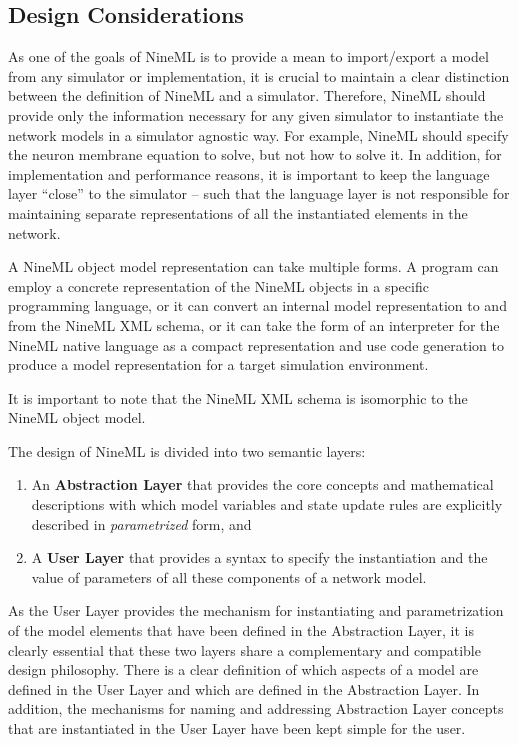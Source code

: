 \documentclass[draftspec]{ninemlspec}
\begin{document}
\subsection{Design Considerations}

As one of the goals of NineML is to provide a mean to import/export a model from
any simulator or implementation, it is crucial to maintain a clear distinction
between the definition of NineML and a simulator. Therefore, NineML should
provide only the information necessary for any given simulator
to instantiate the network models in a simulator agnostic way.
For example, NineML should specify the neuron membrane equation to solve,
but not how to solve it.  In addition, for implementation and performance
reasons, it is important to keep the language layer ``close'' to the simulator
-- such that the language layer is not responsible for maintaining separate
representations of all the instantiated elements in the network.

A NineML object model representation can take multiple forms.  A
program can employ a concrete representation of the NineML objects in
a specific programming language, or it can convert an internal model
representation to and from the NineML XML schema, or it can take the
form of an interpreter for the NineML native language as a compact
representation and use code generation to produce a model
representation for a target simulation environment.

It is important to note that the NineML XML schema is isomorphic to the NineML
object model.

The design of NineML is divided into two semantic layers:
\begin {enumerate}
\item An {\bf Abstraction Layer} that provides the core concepts and
mathematical descriptions with which model variables and state update
rules are explicitly described in {\em parametrized} form, and
\item A {\bf User Layer} that provides a syntax to specify the
instantiation and the value of parameters of all these components of a network
model.
\end {enumerate}

As the User Layer provides the mechanism for instantiating and
parametrization of the model elements that have been defined in the
Abstraction Layer, it is clearly essential that these two layers share
a complementary and compatible design philosophy. There is a
clear definition of which aspects of a model are defined in the User
Layer and which are defined in the Abstraction Layer. In addition,
the mechanisms for naming and addressing Abstraction Layer concepts
that are instantiated in the User Layer have been kept simple for the
user.
\end{document}

